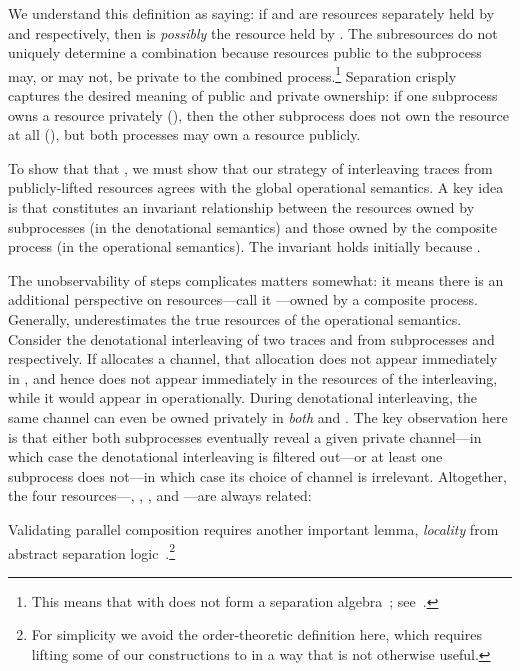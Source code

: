 \documentclass{entcs}
\begin{document}
We understand this definition as saying: if  and 
are resources separately held by  and  respectively, then
 is \emph{possibly} the resource held by .  The
subresources  do not uniquely determine a combination
 because resources public to the subprocess may, or may not,
be private to the combined process.\footnote{
  This means that  with  does not form a separation 
  algebra~\cite{Calcagno2007}; see~.
}
Separation crisply captures the desired meaning of public and private
ownership: if one subprocess owns a resource privately (), then the other subprocess does not own the resource at all (), but both processes may own a resource
publicly.




To show that that \parallel, we must show that our strategy of interleaving traces from
publicly-lifted resources agrees with the global operational
semantics.  A key idea is that  constitutes an invariant relationship between the resources
owned by subprocesses (in the denotational semantics) and those owned
by the composite process (in the operational semantics).  The
invariant holds initially because .



The unobservability of  steps complicates matters somewhat: it
means there is an additional perspective on resources---call it
---owned by a composite process.  Generally,
 underestimates the true resources  of the
operational semantics.  Consider the denotational interleaving of two
traces  and  from subprocesses  and  respectively.
If  allocates a channel, that allocation does not appear
immediately in , and hence does not appear immediately in the
resources  of the interleaving, while it would
appear in  operationally.  During denotational interleaving,
the same channel can even be owned privately in \emph{both} 
and .  The key observation here is that either both
subprocesses eventually reveal a given private channel---in which case
the denotational interleaving is filtered out---or at least one
subprocess does not---in which case its choice of channel is
irrelevant.  Altogether, the four resources---,
, , and ---are always
related: 












Validating parallel composition requires another important lemma,
\emph{locality} from abstract separation
logic~\cite{Calcagno2007}.\footnote{ For simplicity we avoid the
  order-theoretic definition here, which requires lifting some of our
  constructions to  in a way that is not otherwise useful.
}
\end{document}
